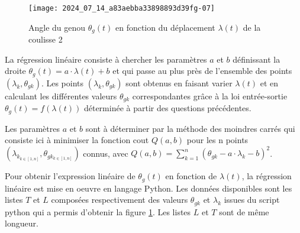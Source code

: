 \begin{figure}[!h]\centering
\texttt{[image: 2024\_07\_14\_a83aebba33898893d39fg-07]}

\caption{\label{fig:ccs_mp_2024:fig:11}Angle du genou $\theta_{g}(t)$ en fonction du déplacement $\lambda(t)$ de la coulisse 2}
\end{figure}

La régression linéaire consiste à chercher les paramètres $a$ et $b$ définissant la droite $\theta_{g}(t)=a \cdot \lambda(t)+b$ et qui passe au plus près de l'ensemble des points $\left(\lambda_{k}, \theta_{g k}\right)$. Les points $\left(\lambda_{k}, \theta_{g k}\right)$ sont obtenus en faisant varier $\lambda(t)$ et en calculant les différentes valeurs $\theta_{g k}$ correspondantes grâce à la loi entrée-sortie $\theta_{g}(t)=f(\lambda(t))$ déterminée à partir des questions précédentes.

Les paramètres $a$ et $b$ sont à déterminer par la méthode des moindres carrés qui consiste ici à minimiser la fonction cout $Q(a, b)$ pour les n points $\left(\lambda_{k_{k \in[1, n]}}, \theta_{g k_{k \in[1, n]}}\right)$ connus, avec $Q(a, b)=\sum_{k=1}^{n}\left(\theta_{g k}-a \cdot \lambda_{k}-b\right)^{2}$.



Pour obtenir l'expression linéaire de $\theta_{g}(t)$ en fonction de $\lambda(t)$, la régression linéaire est mise en oeuvre en langage Python. Les données disponibles sont les listes $T$ et $L$ composées respectivement des valeurs $\theta_{g k}$ et $\lambda_{k}$ issues du script python qui a permis d'obtenir la figure \ref{fig:ccs_mp_2024:fig:11}. Les listes $L$ et $T$ sont de même longueur.


